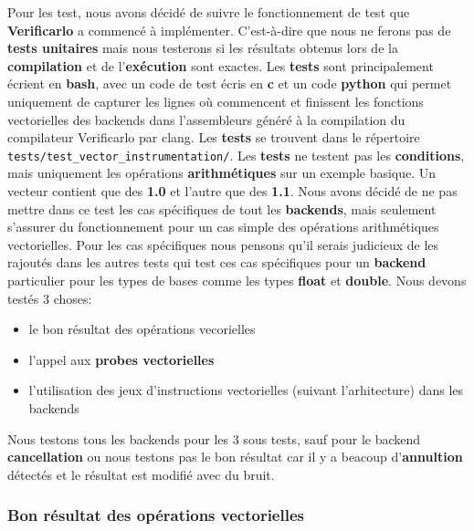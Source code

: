 \documentclass[11pt]{article}
\begin{document}
Pour les test, nous avons décidé de suivre le fonctionnement de
test que \textbf{Verificarlo} a commencé à implémenter. C'est-à-dire que
nous ne ferons pas de \textbf{tests unitaires} mais nous testerons si les
résultats obtenus lors de la \textbf{compilation} et de l'\textbf{exécution} sont
exactes.
\vspace{5mm}
Les \textbf{tests} sont principalement écrient en \textbf{bash}, avec un code de
test écris en \textbf{c} et un code \textbf{python} qui permet uniquement de
capturer les lignes où commencent et finissent les fonctions
vectorielles des backends dans l'assembleurs généré à la
compilation du compilateur Verificarlo par clang. Les \textbf{tests} se
trouvent dans le répertoire \texttt{tests/test\_vector\_instrumentation/}.
\vspace{5mm}
Les \textbf{tests} ne testent pas les \textbf{conditions}, mais uniquement les
opérations \textbf{arithmétiques} sur un exemple basique. Un vecteur contient que
des \textbf{1.0} et l'autre que des \textbf{1.1}. Nous avons décidé de ne pas mettre dans
ce test les cas spécifiques de tout les \textbf{backends}, mais seulement s'assurer
du fonctionnement pour un cas simple des opérations arithmétiques
vectorielles. Pour les cas spécifiques nous pensons qu'il serais judicieux de
les rajoutés dans les autres tests qui test ces cas spécifiques pour un
\textbf{backend} particulier pour les types de bases comme les types \textbf{float} et
\textbf{double}.
\vspace{5mm}
Nous devons testés 3 choses:
\begin{itemize}
\item le bon résultat des opérations vecorielles
\item l'appel aux \textbf{probes vectorielles}
\item l'utilisation des jeux d'instructions vectorielles (suivant
l'arhitecture) dans les backends
\end{itemize}
\vspace{5mm}
Nous testons tous les backends pour les 3 sous tests, sauf pour le backend
\textbf{cancellation} ou nous testons pas le bon résultat car il y a beacoup
d'\textbf{annultion} détectés et le résultat est modifié avec du bruit.

\subsubsection{Bon résultat des opérations vectorielles}
\label{sec:org9d6cd5f}
\end{document}

